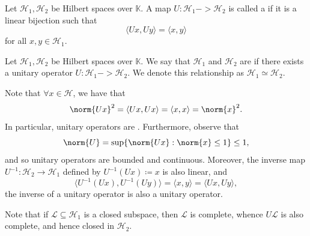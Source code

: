 \documentclass[notoc,notitlepage]{tufte-book}
\begin{document}
\begin{defn}\label{defn:unitary_operator}
  Let $\mathcal{H}_1, \mathcal{H}_2$ be Hilbert spaces over $\mathbb{K}$.
  A map $U : \mathcal{H}_1 -> \mathcal{H}_2$
  is called a  
  if it is a linear bijection such that
  \begin{equation*}
    \langle Ux, Uy \rangle = \langle x, y \rangle
  \end{equation*}
  for all $x, y \in \mathcal{H}_1$.
\end{defn}

\begin{defn}\label{defn:isomorphism_of_hilbert_spaces}
  Let $\mathcal{H}_1, \mathcal{H}_2$ be Hilbert spaces over $\mathbb{K}$.
  We say that $\mathcal{H}_1$ and $\mathcal{H}_2$ are 
  if there exists a unitary operator
  $U : \mathcal{H}_1 -> \mathcal{H}_2$.
  We denote this relationship as $\mathcal{H}_1 \simeq \mathcal{H}_2$.
\end{defn}

\begin{note}
  Note that $\forall x \in \mathcal{H}$, we have that
  \begin{equation*}
    \norm{Ux}^2 = \langle Ux, Ux \rangle = \langle x, x \rangle = \norm{x}^2.
  \end{equation*}
  In particular, unitary operators are .
  Furthermore, observe that
  \begin{equation*}
    \norm{U} = \sup \{ \norm{Ux} : \norm{x} \leq 1 \} \leq 1,
  \end{equation*}
  and so unitary operators are bounded and continuous.
  Moreover, the inverse map $U^{-1} : \mathcal{H}_2 \to \mathcal{H}_1$
  defined by $U^{-1}(Ux) \coloneqq x$ is also linear,
  and
  \begin{equation*}
    \langle U^{-1}(Ux), U^{-1}(Uy) \rangle = \langle x, y \rangle = \langle Ux, Uy \rangle,
  \end{equation*}
  the inverse of a unitary operator is also a unitary operator.
\end{note}

\begin{remark}
  Note that if $\mathcal{L} \subseteq \mathcal{H}_1$ is a closed subspace,
  then $\mathcal{L}$ is complete,
  whence $U \mathcal{L}$ is also complete,
  and hence closed in $\mathcal{H}_2$.
\end{remark}
\end{document}
